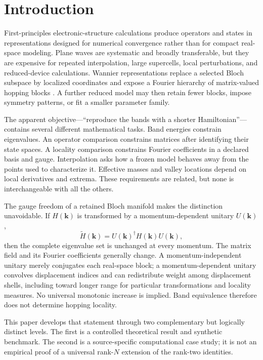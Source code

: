 \documentclass[11pt]{article}
\theoremstyle{definition}
\newcommand{\kvec}{\mathbf k}
\begin{document}
\section{Introduction}

First-principles electronic-structure calculations produce operators and states in
representations designed for numerical convergence rather than for compact real-space
modeling.  Plane waves are systematic and broadly transferable, but they are expensive
for repeated interpolation, large supercells, local perturbations, and reduced-device
calculations.  Wannier representations replace a selected Bloch subspace by localized
coordinates and expose a Fourier hierarchy of matrix-valued hopping blocks
\cite{marzari1997,souza2001,marzari2012,pizzi2020,yates2007}.  A further reduced model
may then retain fewer blocks, impose symmetry patterns, or fit a smaller parameter
family.

The apparent objective---``reproduce the bands with a shorter Hamiltonian''---contains
several different mathematical tasks.  Band energies constrain eigenvalues.  An
operator comparison constrains matrices after identifying their state spaces.  A
locality comparison constrains Fourier coefficients in a declared basis and gauge.
Interpolation asks how a frozen model behaves away from the points used to characterize
it.  Effective masses and valley locations depend on local derivatives and extrema.
These requirements are related, but none is interchangeable with all the others.

The gauge freedom of a retained Bloch manifold makes the distinction unavoidable.  If
$H(\kvec)$ is transformed by a momentum-dependent unitary $U(\kvec)$,
\begin{equation}
 \widetilde H(\kvec)=U(\kvec)^\dagger H(\kvec)U(\kvec),
 \label{eq:intro-gauge}
\end{equation}
then the complete eigenvalue set is unchanged at every momentum.  The matrix field and
its Fourier coefficients generally change.  A momentum-independent unitary merely
conjugates each real-space block; a momentum-dependent unitary convolves displacement
indices and can redistribute weight among displacement shells, including toward longer
range for particular transformations and locality measures.  No universal monotonic
increase is implied.  Band equivalence therefore does not determine hopping locality.

This paper develops that statement through two complementary but logically distinct
levels.  The first is a controlled theoretical result and synthetic benchmark.  The
second is a source-specific computational case study; it is not an empirical proof of a
universal rank-$N$ extension of the rank-two identities.
\end{document}

